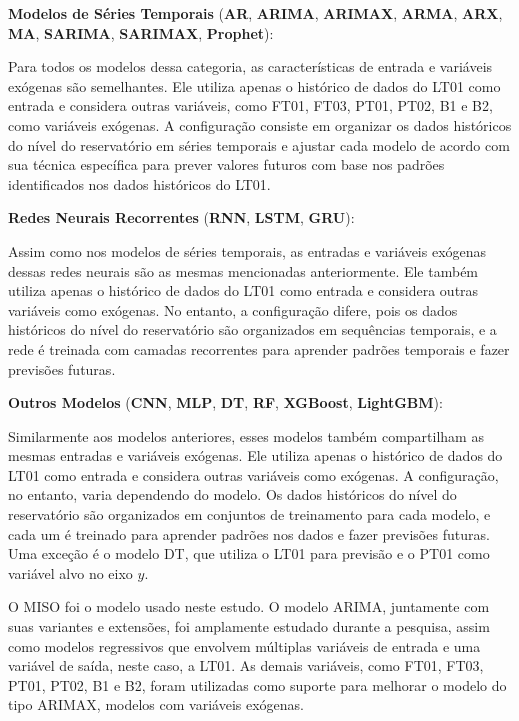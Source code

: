 \noindent\textbf{Modelos de Séries Temporais} (\textbf{AR}, \textbf{ARIMA}, \textbf{ARIMAX}, \textbf{ARMA}, \textbf{ARX}, \textbf{MA}, \textbf{SARIMA}, \textbf{SARIMAX}, \textbf{Prophet}):

Para todos os modelos dessa categoria, as características de entrada e variáveis exógenas são semelhantes. Ele utiliza apenas o histórico de dados do LT01 como entrada e considera outras variáveis, como FT01, FT03, PT01, PT02, B1 e B2, como variáveis exógenas. A configuração consiste em organizar os dados históricos do nível do reservatório em séries temporais e ajustar cada modelo de acordo com sua técnica específica para prever valores futuros com base nos padrões identificados nos dados históricos do LT01.

\noindent\textbf{Redes Neurais Recorrentes} (\textbf{RNN}, \textbf{LSTM}, \textbf{GRU}):

Assim como nos modelos de séries temporais, as entradas e variáveis exógenas dessas redes neurais são as mesmas mencionadas anteriormente. Ele também utiliza apenas o histórico de dados do LT01 como entrada e considera outras variáveis como exógenas. No entanto, a configuração difere, pois os dados históricos do nível do reservatório são organizados em sequências temporais, e a rede é treinada com camadas recorrentes para aprender padrões temporais e fazer previsões futuras.

\noindent\textbf{Outros Modelos} (\textbf{CNN}, \textbf{MLP}, \textbf{DT}, \textbf{RF}, \textbf{XGBoost}, \textbf{LightGBM}):

Similarmente aos modelos anteriores, esses modelos também compartilham as mesmas entradas e variáveis exógenas. Ele utiliza apenas o histórico de dados do LT01 como entrada e considera outras variáveis como exógenas. A configuração, no entanto, varia dependendo do modelo. Os dados históricos do nível do reservatório são organizados em conjuntos de treinamento para cada modelo, e cada um é treinado para aprender padrões nos dados e fazer previsões futuras. Uma exceção é o modelo DT, que utiliza o LT01 para previsão e o PT01 como variável alvo no eixo $y$.


O MISO foi o modelo usado neste estudo. O modelo ARIMA, juntamente com suas variantes e extensões, foi amplamente estudado durante a pesquisa, assim como modelos regressivos que envolvem múltiplas variáveis de entrada e uma variável de saída, neste caso, a LT01. As demais variáveis, como FT01, FT03, PT01, PT02, B1 e B2, foram utilizadas como suporte para melhorar o modelo do tipo ARIMAX, modelos com variáveis exógenas.

